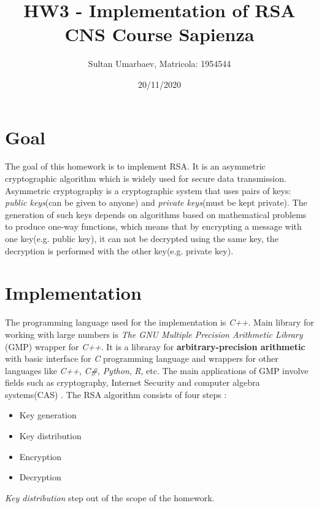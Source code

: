 \documentclass[11 pt]{article}
\title{
    HW3 - Implementation of RSA \\
    \large CNS Course Sapienza
}
\author{Sultan Umarbaev, Matricola: 1954544}
\date{20/11/2020}
\begin{document}
\maketitle

\section{Goal}
The goal of this homework is to implement RSA. It is an asymmetric cryptographic algorithm which is widely used for secure data transmission. Asymmetric cryptography is a cryptographic system that uses pairs of keys: \textit{public keys}(can be given to anyone) and \textit{private keys}(must be kept private). The generation of such keys depends on algorithms based on mathematical problems to produce one-way functions, which means that by encrypting a message with one key(e.g. public key), it can not be decrypted using the same key, the decryption is performed with the other key(e.g. private key).

\section{Implementation}
The programming language used for the implementation is \textit{C++}. Main library for working with large numbers is \textit{The GNU Multiple Precision Arithmetic Library} (GMP) wrapper for \textit{C++}. It is a libraray for \textbf{arbitrary-precision arithmetic} with basic interface for \textit{C} programming language and wrappers for other languages like \textit{C++}, \textit{C\#}, \textit{Python}, \textit{R}, etc. The main applications of GMP involve fields such as cryptography, Internet Security and computer algebra systems(CAS) \cite{GMP}. 
\newline
The RSA algorithm consists of four steps \cite{RSA operation wiki}:
\begin{itemize}
	\item Key generation
	\item Key distribution
	\item Encryption
	\item Decryption
\end{itemize}
\textit{Key distribution} step out of the scope of the homework.

\end{document}
